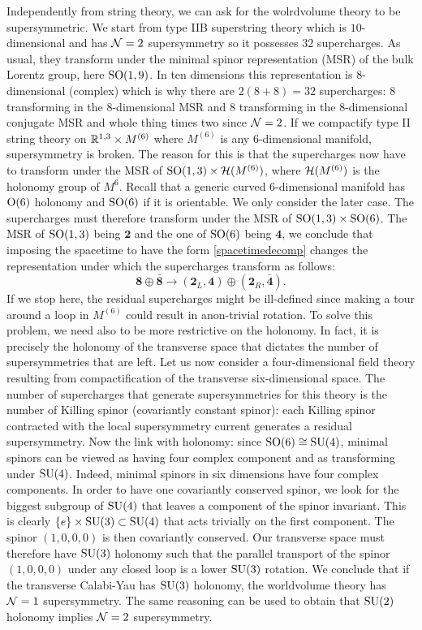         Independently from string theory, we can ask for the wolrdvolume theory to be supersymmetric. We start from type IIB superstring theory which is $10$-dimensional and has $\mathcal{N}=2$ supersymmetry so it possesses $32$ supercharges. As usual, they transform under the minimal spinor representation (MSR) of the bulk Lorentz group, here $\text{SO}(1,9)$. In ten dimensions this representation is $8$-dimensional (complex) which is why there are $2(8+8)=32$ supercharges: $8$ transforming in the $8$-dimensional MSR and $8$ transforming in the $8$-dimensional conjugate MSR and whole thing times two since $\mathcal{N}=2$. If we compactify type II string theory on $\mathbb{R}^{1,3}\times M^{(6)}$ where $M^{(6)}$ is any $6$-dimensional manifold, supersymmetry is broken. The reason for this is that the supercharges now have to transform under the MSR of $\text{SO}(1,3)\times\mathcal{H}(M^{(6)})$\marker, where $\mathcal{H}(M^{(6)})$ is the holonomy group of $M^{6}$. Recall that a generic curved 6-dimensional manifold has $\text{O}(6)$ holonomy and $\text{SO}(6)$ if it is orientable. We only consider the later case. The supercharges must therefore transform under the MSR of $\text{SO}(1,3)\times\text{SO}(6)$. The MSR of $\text{SO}(1,3)$ being $\boldsymbol{2}$ and the one of $\text{SO}(6)$ being $\boldsymbol{4}$, we conclude that imposing the spacetime to have the form \eqref{spacetimedecomp} changes the representation under which the supercharges transform as follows:
        \begin{equation}
            \boldsymbol{8}\oplus\bar{\boldsymbol{8}}\to (\boldsymbol{2}_L,\boldsymbol{4})\oplus(\boldsymbol{2}_R,\bar{\boldsymbol{4}}).
        \end{equation}
        If we stop here, the residual supercharges might be ill-defined since making a tour around a loop in $M^{(6)}$ could result in anon-trivial rotation. To solve this problem, we need also to be more restrictive on the holonomy. In fact, it is precisely the holonomy of the transverse space that dictates the number of supersymmetries that are left. Let us now consider a four-dimensional field theory resulting from compactification of the transverse six-dimensional space. The number of supercharges that generate supersymmetries for this theory is the number of Killing spinor (covariantly constant spinor): each Killing spinor contracted with the local supersymmetry current generates a residual supersymmetry\marker. Now the link with holonomy: since $\text{SO}(6)\cong\text{SU}(4)$, minimal spinors can be viewed as having four complex component and as transforming under $\text{SU}(4)$. Indeed, minimal spinors in six dimensions have four complex components. In order to have one covariantly conserved spinor, we look for the biggest subgroup of $\text{SU}(4)$ that leaves a component of the spinor invariant. This is clearly $\{e\}\times\text{SU}(3)\subset\text{SU}(4)$ that acts trivially on the first component. The spinor $(1,0,0,0)$ is then covariantly conserved. Our transverse space must therefore have $\text{SU}(3)$ holonomy such that the parallel transport of the spinor $(1,0,0,0)$ under any closed loop is a lower $\text{SU}(3)$ rotation. We conclude that if the transverse Calabi-Yau has $\text{SU}(3)$ holonomy, the worldvolume theory has $\mathcal{N}=1$ supersymmetry. The same reasoning can be used to obtain that $\text{SU}(2)$ holonomy implies $\mathcal{N}=2$ supersymmetry.

